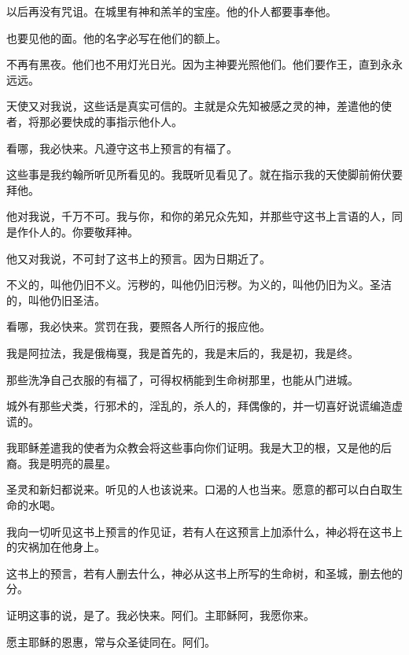 \documentclass[12pt,oneside]{book}
\begin{document}
以后再没有咒诅。在城里有神和羔羊的宝座。他的仆人都要事奉他。

也要见他的面。他的名字必写在他们的额上。

不再有黑夜。他们也不用灯光日光。因为主神要光照他们。他们要作王，直到永永远远。

天使又对我说，这些话是真实可信的。主就是众先知被感之灵的神，差遣他的使者，将那必要快成的事指示他仆人。

看哪，我必快来。凡遵守这书上预言的有福了。

这些事是我约翰所听见所看见的。我既听见看见了。就在指示我的天使脚前俯伏要拜他。

他对我说，千万不可。我与你，和你的弟兄众先知，并那些守这书上言语的人，同是作仆人的。你要敬拜神。

他又对我说，不可封了这书上的预言。因为日期近了。

不义的，叫他仍旧不义。污秽的，叫他仍旧污秽。为义的，叫他仍旧为义。圣洁的，叫他仍旧圣洁。

看哪，我必快来。赏罚在我，要照各人所行的报应他。

我是阿拉法，我是俄梅戛，我是首先的，我是末后的，我是初，我是终。

那些洗净自己衣服的有福了，可得权柄能到生命树那里，也能从门进城。

城外有那些犬类，行邪术的，淫乱的，杀人的，拜偶像的，并一切喜好说谎编造虚谎的。

我耶稣差遣我的使者为众教会将这些事向你们证明。我是大卫的根，又是他的后裔。我是明亮的晨星。

圣灵和新妇都说来。听见的人也该说来。口渴的人也当来。愿意的都可以白白取生命的水喝。

我向一切听见这书上预言的作见证，若有人在这预言上加添什么，神必将在这书上的灾祸加在他身上。

这书上的预言，若有人删去什么，神必从这书上所写的生命树，和圣城，删去他的分。

证明这事的说，是了。我必快来。阿们。主耶稣阿，我愿你来。

愿主耶稣的恩惠，常与众圣徒同在。阿们。

\backmatter
\end{document}
